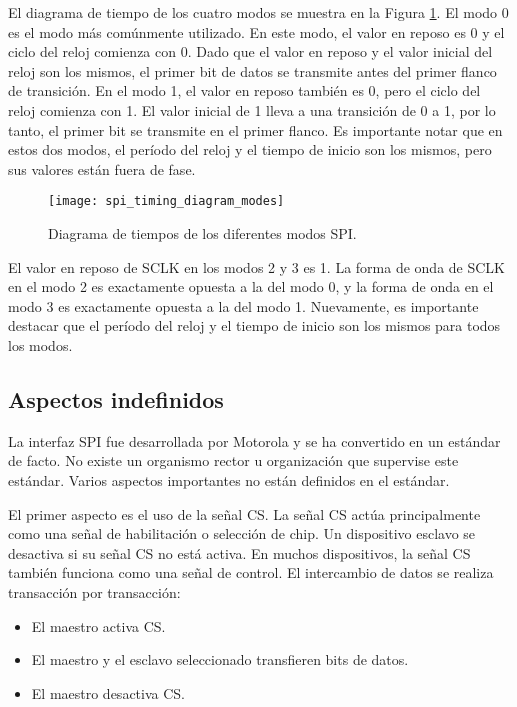     El diagrama de tiempo de los cuatro modos se muestra en la Figura \ref{fig:spi_timing_diagram_modes}. El modo 0 es el modo más comúnmente utilizado. En este modo, el valor en reposo es 0 y el ciclo del reloj comienza con 0. Dado que el valor en reposo y el valor inicial del reloj son los mismos, el primer bit de datos se transmite antes del primer flanco de transición. En el modo 1, el valor en reposo también es 0, pero el ciclo del reloj comienza con 1. El valor inicial de 1 lleva a una transición de 0 a 1, por lo tanto, el primer bit se transmite en el primer flanco. Es importante notar que en estos dos modos, el período del reloj y el tiempo de inicio son los mismos, pero sus valores están fuera de fase.

    \begin{figure}[!h]
      \centering
      \texttt{[image: spi\_timing\_diagram\_modes]}
      \caption{Diagrama de tiempos de los diferentes modos SPI.}
      \label{fig:spi_timing_diagram_modes}
    \end{figure}

    El valor en reposo de SCLK en los modos 2 y 3 es 1. La forma de onda de SCLK en el modo 2 es exactamente opuesta a la del modo 0, y la forma de onda en el modo 3 es exactamente opuesta a la del modo 1. Nuevamente, es importante destacar que el período del reloj y el tiempo de inicio son los mismos para todos los modos.

    \subsection{Aspectos indefinidos}

    La interfaz SPI fue desarrollada por Motorola y se ha convertido en un estándar de facto. No existe un organismo rector u organización que supervise este estándar. Varios aspectos importantes no están definidos en el estándar.

    El primer aspecto es el uso de la señal CS. La señal CS actúa principalmente como una señal de habilitación o selección de chip. Un dispositivo esclavo se desactiva si su señal CS no está activa. En muchos dispositivos, la señal CS también funciona como una señal de control. El intercambio de datos se realiza transacción por transacción:

    \begin{itemize}
      \item El maestro activa CS.
      \item El maestro y el esclavo seleccionado transfieren bits de datos.
      \item El maestro desactiva CS.
    \end{itemize}

